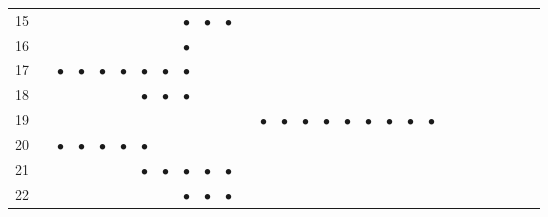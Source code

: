 \documentclass[text.tex]{subfiles}
\begin{document}
\begin{table}
{\begin{tabular}{l|ccccccccccccccccccccccccccc}
15  &           &           &           &           &           &           &           & $\bullet$ & $\bullet$ & $\bullet$ &           &           &           &           &           &           &           &           &           &           &           &           &           &           &           &           &           \\
16  &           &           &           &           &           &           &           & $\bullet$ &           &           &           &           &           &           &           &           &           &           &           &           &           &           &           &           &           &           &           \\
17  &           & $\bullet$ & $\bullet$ & $\bullet$ & $\bullet$ & $\bullet$ & $\bullet$ & $\bullet$ &           &           &           &           &           &           &           &           &           &           &           &           &           &           &           &           &           &           &           \\
18  &           &           &           &           &           & $\bullet$ & $\bullet$ & $\bullet$ &           &           &           &           &           &           &           &           &           &           &           &           &           &           &           &           &           &           &           \\
19  &           &           &           &           &           &           &           &           &           &           &           & $\bullet$ & $\bullet$ & $\bullet$ & $\bullet$ & $\bullet$ & $\bullet$ & $\bullet$ & $\bullet$ & $\bullet$ &           &           &           &           &           &           &           \\
20  &           & $\bullet$ & $\bullet$ & $\bullet$ & $\bullet$ & $\bullet$ &           &           &           &           &           &           &           &           &           &           &           &           &           &           &           &           &           &           &           &           &           \\
21  &           &           &           &           &           & $\bullet$ & $\bullet$ & $\bullet$ & $\bullet$ & $\bullet$ &           &           &           &           &           &           &           &           &           &           &           &           &           &           &           &           &           \\
22  &           &           &           &           &           &           &           & $\bullet$ & $\bullet$ & $\bullet$ &           &           &           &           &           &           &           &           &           &           &           &           &           &           &           &           &           \\

\end{tabular}}
\end{table}
\end{document}
